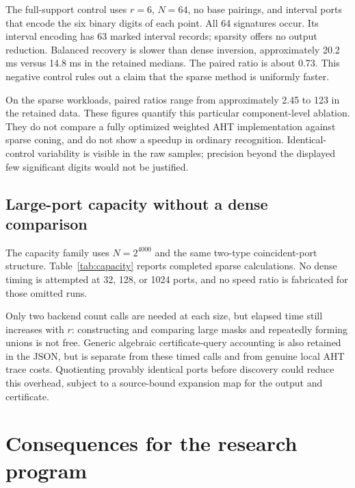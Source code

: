 \documentclass[11pt]{article}
\theoremstyle{definition}
\begin{document}
The full-support control uses $r=6$, $N=64$, no base pairings, and interval
ports that encode the six binary digits of each point. All 64 signatures
occur. Its interval encoding has 63 marked interval records; sparsity offers
no output reduction. Balanced recovery is slower than dense inversion,
approximately 20.2 ms versus 14.8 ms in the retained medians. The paired
ratio is about 0.73. This negative control rules out a claim that the sparse
method is uniformly faster.

On the sparse workloads, paired ratios range from approximately 2.45 to
123 in the retained data. These figures quantify this particular
component-level ablation. They do not compare a fully optimized weighted
AHT implementation against sparse coning, and do not show a speedup in
ordinary recognition. Identical-control variability is visible in the raw
samples; precision beyond the displayed few significant digits would not
be justified.

\subsection{Large-port capacity without a dense comparison}
The capacity family uses $N=2^{4000}$ and the same two-type coincident-port
structure. Table~\ref{tab:capacity} reports completed sparse calculations.
No dense timing is attempted at 32, 128, or 1024 ports, and no speed ratio
is fabricated for those omitted runs.
\begin{table}[h]
\centering\small

\caption{Completed large-port sparse queries. These are capacity observations,
not ratios against an executed dense arm. Endpoint size is binary length.}
\label{tab:capacity}
\end{table}

Only two backend count calls are needed at each size, but elapsed time still
increases with $r$: constructing and comparing large masks and repeatedly
forming unions is not free. Generic algebraic certificate-query accounting
is also retained in the JSON, but is separate from these timed calls and
from genuine local AHT trace costs. Quotienting provably identical ports
before discovery could reduce this overhead, subject to a source-bound
expansion map for the output and certificate.

\section{Consequences for the research program}
\label{sec:global}
\end{document}
